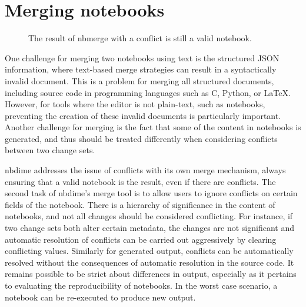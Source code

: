 \documentclass{deliverablereport}
\begin{document}

\section{Merging notebooks} %
\label{sec:merging_notebooks}

\begin{figure}
    \center
    \caption{The result of nbmerge with a conflict is still a valid notebook.}
    \label{fig:nbmerge}
\end{figure}

One challenge for merging two notebooks using text is the structured JSON information, where
text-based merge strategies can result in a syntactically invalid document. This is a problem for
merging all structured documents, including source code in programming languages such as C, Python,
or \LaTeX. However, for tools where the editor is not plain-text, such as notebooks, preventing the
creation of these invalid documents is particularly important. Another challenge for merging is the
fact that some of the content in notebooks is generated, and thus should be treated differently
when considering conflicts between two change sets.

nbdime addresses the issue of conflicts with its own merge mechanism, always ensuring that a valid notebook is the result, even if there are conflicts.
The second task of nbdime's merge tool is to allow users to ignore conflicts on certain fields of the notebook.
There is a hierarchy of significance in the content of notebooks,
and not all changes should be considered conflicting.
For instance, if two change sets both alter certain metadata,
the changes are not significant and automatic resolution of conflicts
can be carried out aggressively by clearing conflicting values.
Similarly for generated output, conflicts can be automatically resolved without the consequences of automatic resolution in the source code.
It remains possible to be strict about differences in output,
especially as it pertains to evaluating the reproducibility of notebooks.
In the worst case scenario, a notebook can be re-executed to produce new output.
\end{document}
